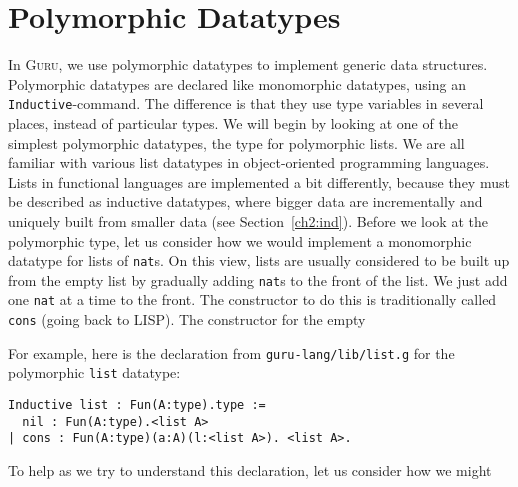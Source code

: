 \documentclass{book}[12pt]
\newcommand{\guru}[0]{\textsc{Guru}\xspace}
\begin{document}
\section{Polymorphic Datatypes}

In \guru, we use polymorphic datatypes to implement generic data
structures.  Polymorphic datatypes are declared like monomorphic
datatypes, using an \texttt{Inductive}-command.  The difference is
that they use type variables in several places, instead of particular
types.  We will begin by looking at one of the simplest polymorphic
datatypes, the type for polymorphic lists.  We are all familiar with
various list datatypes in object-oriented programming languages.
Lists in functional languages are implemented a bit differently,
because they must be described as inductive datatypes, where bigger
data are incrementally and uniquely built from smaller data (see
Section~\ref{ch2:ind}).  Before we look at the polymorphic type, let
us consider how we would implement a monomorphic datatype for lists of
\texttt{nat}s.  On this view, lists are usually considered to be built
up from the empty list by gradually adding \texttt{nat}s to the front
of the list.  We just add one \texttt{nat} at a time to the front.
The constructor to do this is traditionally called \texttt{cons}
(going back to \textsc{LISP}).  The constructor for the empty 

For example, here is the
declaration from \texttt{guru-lang/lib/list.g} for the polymorphic
\texttt{list} datatype:

\begin{verbatim}
Inductive list : Fun(A:type).type :=
  nil : Fun(A:type).<list A>
| cons : Fun(A:type)(a:A)(l:<list A>). <list A>.
\end{verbatim}

\noindent To help as we try to understand this declaration, let
us consider how we might 




\end{document}
